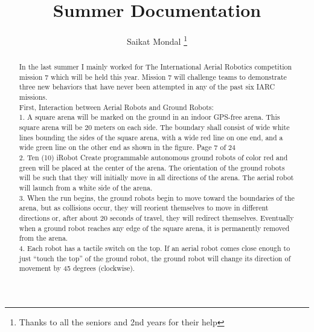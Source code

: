 \documentclass[letterpaper, 10 pt, conference]{ieeeconf}
\title{\LARGE \bf
Summer Documentation 
}
\author{Saikat Mondal 
\thanks{ Thanks to all the seniors and 2nd years for their help}
}
\begin{document}
\maketitle 
\thispagestyle{empty}
\pagestyle{empty}


\begin{abstract}

In the last summer I mainly worked for The International Aerial Robotics competition mission 7 which will be held this year.
Mission 7 will challenge teams to demonstrate 
three  new  behaviors  that  have  never  been  attempted in any of the past six IARC missions.\\
First,
Interaction    between    Aerial    Robots    and    
Ground  Robots:\\


1.   A  square  arena  will be marked  on  the  ground 
in an indoor GPS-free arena.  This square 
arena will be 20 meters on each side.  The 
boundary  shall  consist  of  wide  white  lines  
bounding the sides of the square arena, with 
a wide red line on one end, and a wide green 
line on the other end as shown in the figure.
Page 7 of  24\\

2.   Ten  (10)  iRobot  Create  programmable autonomous
ground  robots of color red and green  will  be  placed  at  the  center  of the arena.  The orientation of the ground 
robots  will  be  such  that  they  will  initially  
move  in  all  directions  of  the  arena.    The 
aerial robot will launch from a white side of 
the arena.\\

3.   When the run begins, the ground robots begin 
to  move  toward  the  boundaries  of  the  arena,  
but  as  collisions  occur,  they  will  reorient  
themselves  to  move  in  different  directions  
or,  after  about  20  seconds  of  travel,  they  
will redirect themselves.  Eventually when a 
ground  robot  reaches  any  edge  of  the  square  
arena,  it  is  permanently  removed  from  the  
arena.\\

4.   Each robot has a tactile switch on the top.  
If  an  aerial  robot  comes  close  enough  to  
just “touch the top” of the ground robot, the 
ground  robot  will  change  its  direction  of  
movement by 45 degrees (clockwise).\\


\end{abstract}
\end{document}
